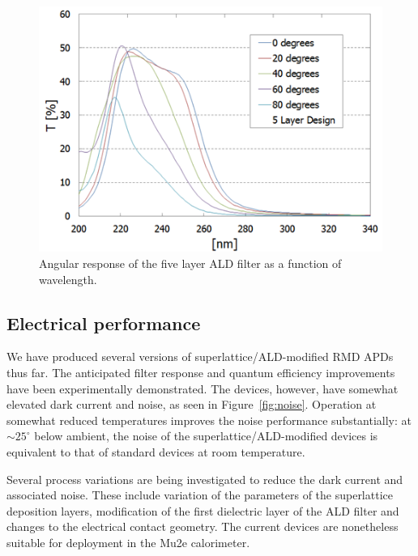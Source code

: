 \begin{figure}[h!]
\centering
\includegraphics[width=0.9\linewidth]{Figures/angle.png}
\caption{Angular response of the five layer ALD filter as a function of wavelength.}
\label{fig:angle}
\end{figure}


\subsection{Electrical performance}

We have produced several versions of superlattice/ALD-modified RMD APDs thus far. The anticipated filter response and quantum efficiency improvements have been experimentally demonstrated. The devices, however, have somewhat elevated dark current and noise, as seen in Figure~\ref{fig:noise}. Operation at somewhat reduced temperatures improves the noise performance substantially: at $\sim\!\! 25^\circ$ below ambient, the noise of the superlattice/ALD-modified devices is equivalent to that of standard devices at room temperature.

Several process variations are being investigated to reduce the dark current and associated noise. These include variation of the parameters of the superlattice deposition layers, modification of the first dielectric layer of the ALD filter and changes to the electrical contact geometry. The current devices are nonetheless suitable for deployment in the Mu2e calorimeter.

